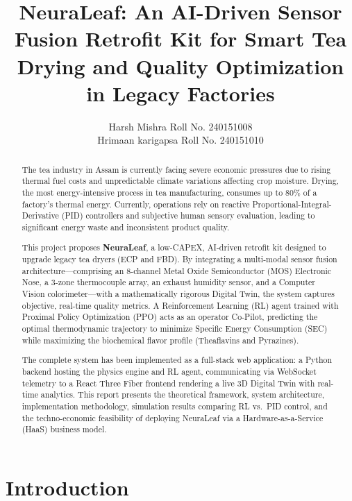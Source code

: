 ﻿\documentclass[12pt, a4paper]{report}
\title{
    \vspace{-2cm}
    \LARGE{\textbf{NeuraLeaf: An AI-Driven Sensor Fusion Retrofit Kit for Smart Tea Drying and Quality Optimization in Legacy Factories}}\\
}
\author{Harsh Mishra \quad Roll No. 240151008\\Hrimaan karigapsa \quad Roll No. 240151010}
\date{}
\begin{document}
\maketitle

\begin{abstract}
The tea industry in Assam is currently facing severe economic pressures due to rising thermal fuel costs and unpredictable climate variations affecting crop moisture. Drying, the most energy-intensive process in tea manufacturing, consumes up to 80\% of a factory's thermal energy. Currently, operations rely on reactive Proportional-Integral-Derivative (PID) controllers and subjective human sensory evaluation, leading to significant energy waste and inconsistent product quality.

This project proposes \textbf{NeuraLeaf}, a low-CAPEX, AI-driven retrofit kit designed to upgrade legacy tea dryers (ECP and FBD). By integrating a multi-modal sensor fusion architecture---comprising an 8-channel Metal Oxide Semiconductor (MOS) Electronic Nose, a 3-zone thermocouple array, an exhaust humidity sensor, and a Computer Vision colorimeter---with a mathematically rigorous Digital Twin, the system captures objective, real-time quality metrics. A Reinforcement Learning (RL) agent trained with Proximal Policy Optimization (PPO) acts as an operator Co-Pilot, predicting the optimal thermodynamic trajectory to minimize Specific Energy Consumption (SEC) while maximizing the biochemical flavor profile (Theaflavins and Pyrazines).

The complete system has been implemented as a full-stack web application: a Python backend hosting the physics engine and RL agent, communicating via WebSocket telemetry to a React Three Fiber frontend rendering a live 3D Digital Twin with real-time analytics. This report presents the theoretical framework, system architecture, implementation methodology, simulation results comparing RL vs.\ PID control, and the techno-economic feasibility of deploying NeuraLeaf via a Hardware-as-a-Service (HaaS) business model.
\end{abstract}

\tableofcontents

\chapter{Introduction}
\end{document}
